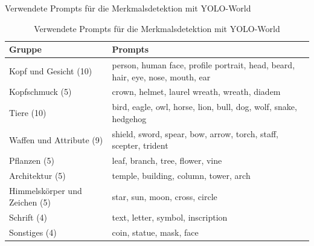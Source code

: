 Verwendete Prompts für die Merkmalsdetektion mit YOLO-World
\begin{table}[H]
    \centering
    \caption{Verwendete Prompts für die Merkmalsdetektion mit YOLO-World}
    \label{tab:promptliste}

    \begin{tabularx}{\textwidth}{|l|X|}
        \hline
        \textbf{Gruppe} &
        \textbf{Prompts} \\
        \hline

        Kopf und Gesicht (10)
            & person, human face, profile portrait, head, beard, hair, eye, nose, mouth, ear \\
        \hline

        Kopfschmuck (5)
            & crown, helmet, laurel wreath, wreath, diadem \\
        \hline

        Tiere (10)
            & bird, eagle, owl, horse, lion, bull, dog, wolf, snake, hedgehog \\
        \hline

        Waffen und Attribute (9)
            & shield, sword, spear, bow, arrow, torch, staff, scepter, trident \\
        \hline

        Pflanzen (5)
            & leaf, branch, tree, flower, vine \\
        \hline

        Architektur (5)
            & temple, building, column, tower, arch \\
        \hline

        Himmelskörper und Zeichen (5)
            & star, sun, moon, cross, circle \\
        \hline

        Schrift (4)
            & text, letter, symbol, inscription \\
        \hline

        Sonstiges (4)
            & coin, statue, mask, face \\
        \hline
    \end{tabularx}
\end{table}

